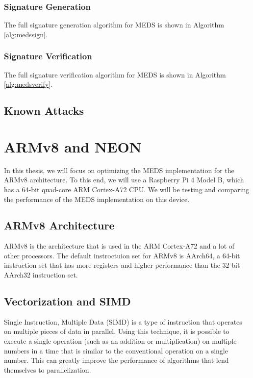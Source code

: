 \documentclass[11pt,a4paper]{report}
\theoremstyle{definition}
\begin{document}
\subsubsection{Signature Generation}
The full signature generation algorithm for MEDS is shown in Algorithm \ref{alg:medssign}.

\subsubsection{Signature Verification}
The full signature verification algorithm for MEDS is shown in Algorithm \ref{alg:medsverify}.

\subsection{Known Attacks}

\section{ARMv8 and NEON}
\label{sec:armv8}
In this thesis, we will focus on optimizing the MEDS implementation for the ARMv8 architecture. To this end, we will use a Raspberry Pi 4 Model B, which has a 64-bit quad-core ARM Cortex-A72 CPU. We will be testing and comparing the performance of the MEDS implementation on this device.

\subsection{ARMv8 Architecture}
ARMv8 is the architecture that is used in the ARM Cortex-A72 and a lot of other processors. The default instroctuion set for ARMv8 is AArch64, a 64-bit instruction set that has more registers and higher performance than the 32-bit AArch32 instruction set.

\subsection{Vectorization and SIMD}
Single Instruction, Multiple Data (SIMD) is a type of instruction that operates on multiple pieces of data in parallel. Using this technique, it is possible to execute a single operation (such as an addition or multiplication) on multiple numbers in a time that is similar to the conventional operation on a single number. This can greatly improve the performance of algorithms that lend themselves to parallelization.
\end{document}
